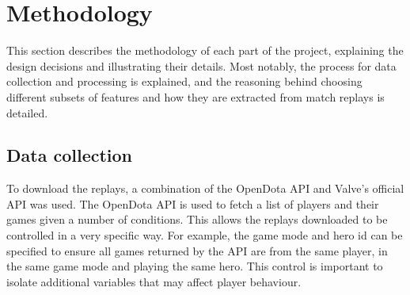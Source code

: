 \documentclass[Report.tex]{subfiles}
\begin{document}
\section{Methodology}
This section describes the methodology of each part of the project, explaining the design decisions and illustrating their details. Most notably, the process for data collection and processing is explained, and the reasoning behind choosing different subsets of features and how they are extracted from match replays is detailed. 


\subsection{Data collection}
To download the replays, a combination of the OpenDota \cite{opendota} API and Valve's official API was used. The OpenDota API is used to fetch a list of players and their games given a number of conditions. This allows the replays downloaded to be controlled in a very specific way. For example, the game mode and hero id can be specified to ensure all games returned by the API are from the same player, in the same game mode and playing the same hero. This control is important to isolate additional variables that may affect player behaviour. 
\end{document}
